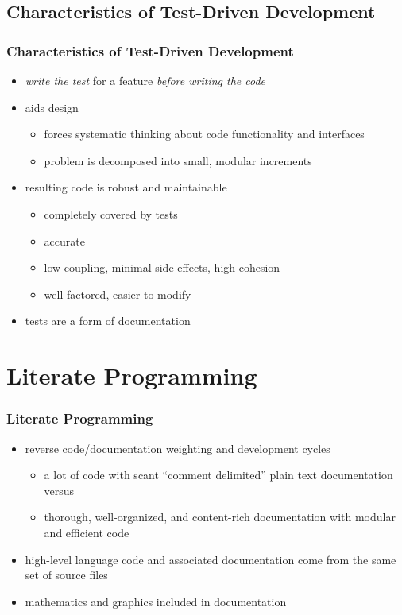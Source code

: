 \documentclass{beamer}
\begin{document}
\subsection{Characteristics of Test-Driven Development}
\begin{frame}
  \frametitle{Characteristics of Test-Driven Development}
  \begin{itemize}
    \item \textit{write the test} for a feature \textit{before writing the code}
    \item aids design
      \begin{itemize}
        \item forces systematic thinking about code functionality and interfaces
        \item problem is decomposed into small, modular increments
      \end{itemize}
    \item resulting code is robust and maintainable 
      \begin{itemize}
        \item completely covered by tests
        \item accurate
        \item low coupling, minimal side effects, high cohesion
        \item well-factored, easier to modify
      \end{itemize}
    \item tests are a form of documentation
  \end{itemize}
\end{frame}

\section{Literate Programming}
\begin{frame}
  \frametitle{Literate Programming}
  \begin{itemize}
    \item reverse code/documentation weighting and development cycles
      \begin{itemize}
        \item a lot of code with scant ``comment delimited'' plain text documentation versus
        \item thorough, well-organized, and content-rich documentation with modular and efficient code
      \end{itemize}
    \item high-level language code and associated documentation come from the same set of source files
    \item mathematics and graphics included in documentation
  \end{itemize}
\end{frame}
\end{document}
